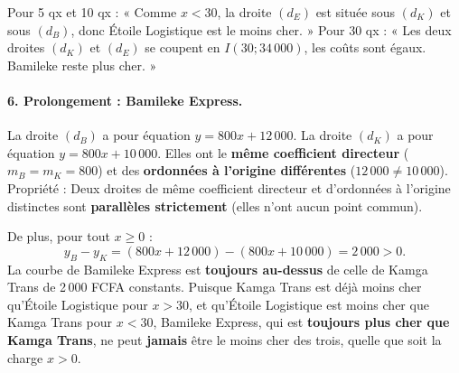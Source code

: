 \documentclass[11pt]{article}
\newcommand{\cle}[1]{{\popxbold\color{popdark}#1}}
\begin{document}
\begin{attention}
Pour 5 qx et 10 qx : « Comme $x < 30$, la droite $(d_E)$ est située sous $(d_K)$ et sous $(d_B)$, donc Étoile Logistique est le moins cher. »
Pour 30 qx : « Les deux droites $(d_K)$ et $(d_E)$ se coupent en $I(30; 34\,000)$, les coûts sont égaux. Bamileke reste plus cher. »
\end{attention}

\begin{exoresolu}
\paragraph{6. Prolongement : Bamileke Express.}
La droite $(d_B)$ a pour équation $y = 800x + 12\,000$. La droite $(d_K)$ a pour équation $y = 800x + 10\,000$.
Elles ont le \textbf{même coefficient directeur} ($m_B = m_K = 800$) et des \textbf{ordonnées à l'origine différentes} ($12\,000 \ne 10\,000$).
\cle{Propriété} : Deux droites de même coefficient directeur et d'ordonnées à l'origine distinctes sont \textbf{parallèles strictement} (elles n'ont aucun point commun).

De plus, pour tout $x \ge 0$ :
$$y_B - y_K = (800x + 12\,000) - (800x + 10\,000) = 2\,000 > 0.$$
La courbe de Bamileke Express est \textbf{toujours au-dessus} de celle de Kamga Trans de 2\,000 FCFA constants.
Puisque Kamga Trans est déjà moins cher qu'Étoile Logistique pour $x > 30$, et qu'Étoile Logistique est moins cher que Kamga Trans pour $x < 30$, Bamileke Express, qui est \textbf{toujours plus cher que Kamga Trans}, ne peut \textbf{jamais} être le moins cher des trois, quelle que soit la charge $x > 0$.
\end{exoresolu}
\end{document}
